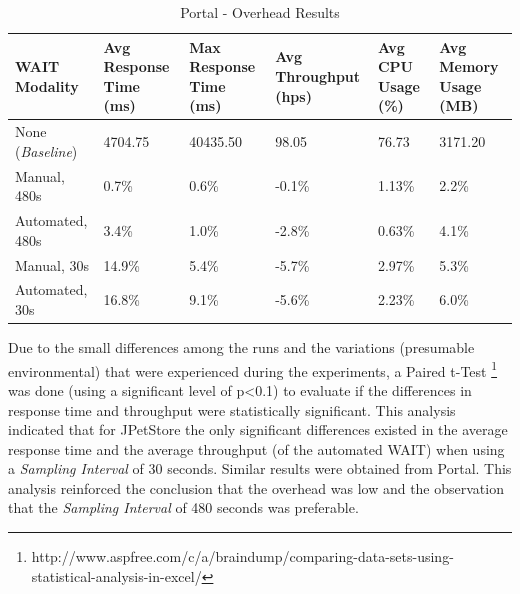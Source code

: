 \documentclass[runningheads,a4paper]{llncs}
\begin{document}
\vspace{-2pt}
\begin{table}[!h]
\caption{Portal - Overhead Results}
\label{Portal1}
\centering
\begin{tabular}{p{}|p{}|p{}|p{}|p{}|p{}}
\hline
\bfseries WAIT Modality & \bfseries Avg Response Time (ms)& \bfseries Max
Response Time (ms)& \bfseries Avg Throughput (hps)& \bfseries Avg CPU Usage
(\%) & \bfseries Avg Memory Usage (MB)\\
\hline
None (\emph{Baseline}) 	& 4704.75	& 40435.50	& 98.05 	& 76.73 	& 3171.20\\
Manual, 480s 			& 0.7\% 	& 0.6\%		& -0.1\%	& 1.13\% 	& 2.2\%\\
Automated, 480s 		& 3.4\%		& 1.0\%		& -2.8\% 	& 0.63\% 	& 4.1\%\\
Manual, 30s 			& 14.9\%	& 5.4\%		& -5.7\% 	& 2.97\% 	& 5.3\%\\
Automated, 30s 			& 16.8\%	& 9.1\%		& -5.6\% 	& 2.23\% 	& 6.0\%\\
\hline
\end{tabular}
\end{table}
\vspace{-2pt}

Due to the small differences among the runs and the variations (presumable
environmental) that were experienced during the experiments, a Paired t-Test
\footnote{http://www.aspfree.com/c/a/braindump/comparing-data-sets-using-statistical-analysis-in-excel/}
was done (using a significant level of p\textless0.1) to evaluate if the
differences in response time and throughput were statistically significant. 
This analysis indicated that 
for JPetStore the only significant differences existed in the average response
time and the average throughput (of the automated WAIT) when using a
\emph{Sampling Interval} of 30 seconds. Similar results were obtained from Portal. This analysis reinforced the
conclusion that the overhead was low and the observation that the
\emph{Sampling Interval} of 480 seconds was preferable.
\end{document}
